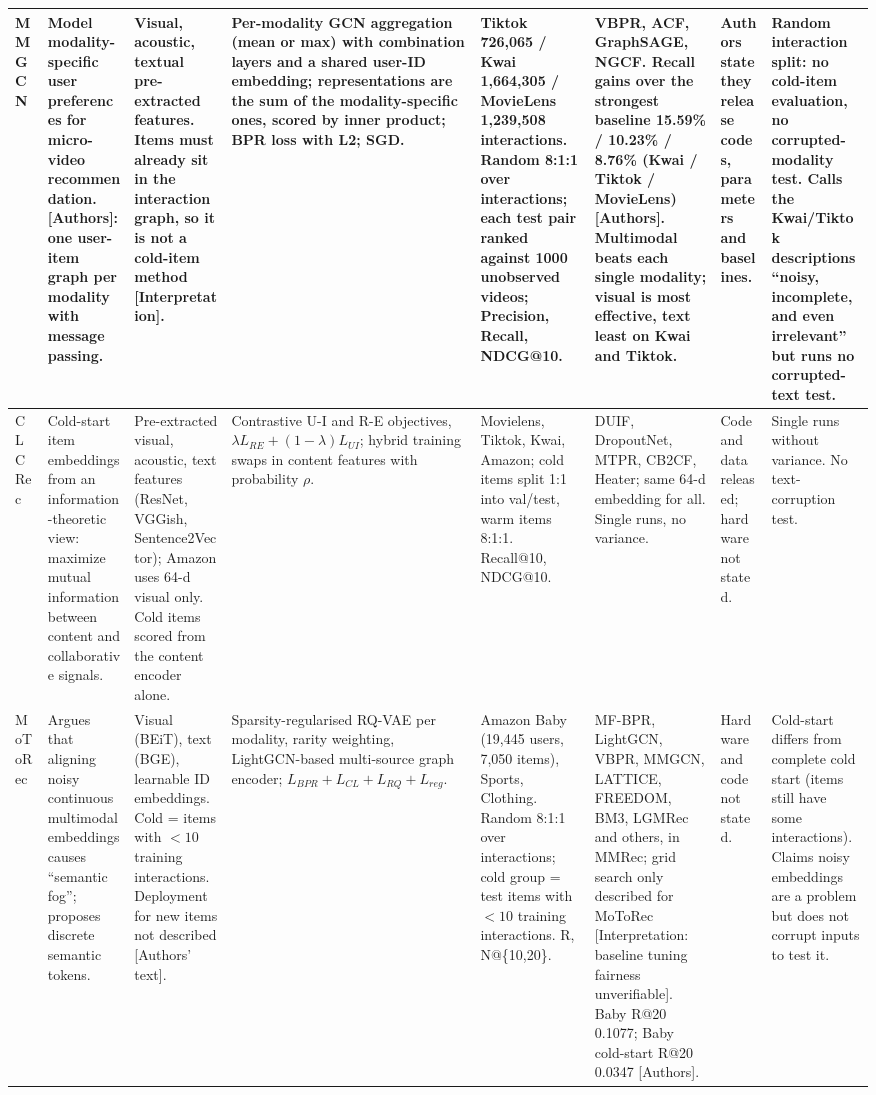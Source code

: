 \documentclass[conference]{IEEEtran}
\begin{document}
\begin{longtable}{@{}p{1.7cm}*{7}{>{\raggedright\arraybackslash}p{2.0cm}}@{}}
MMGCN~\cite{wei2019mmgcn} & Model modality-specific user preferences for micro-video recommendation. [Authors]: one user-item graph per modality with message passing. & Visual, acoustic, textual pre-extracted features. Items must already sit in the interaction graph, so it is not a cold-item method [Interpretation]. & Per-modality GCN aggregation (mean or max) with combination layers and a shared user-ID embedding; representations are the sum of the modality-specific ones, scored by inner product; BPR loss with L2; SGD. & Tiktok 726,065 / Kwai 1,664,305 / MovieLens 1,239,508 interactions. Random 8:1:1 over interactions; each test pair ranked against 1000 unobserved videos; Precision, Recall, NDCG@10. & VBPR, ACF, GraphSAGE, NGCF. Recall gains over the strongest baseline 15.59\% / 10.23\% / 8.76\% (Kwai / Tiktok / MovieLens) [Authors]. Multimodal beats each single modality; visual is most effective, text least on Kwai and Tiktok. & Authors state they release codes, parameters and baselines. & Random interaction split: no cold-item evaluation, no corrupted-modality test. Calls the Kwai/Tiktok descriptions ``noisy, incomplete, and even irrelevant'' but runs no corrupted-text test. \\
\midrule
CLCRec~\cite{wei2021clcrec} & Cold-start item embeddings from an information-theoretic view: maximize mutual information between content and collaborative signals. & Pre-extracted visual, acoustic, text features (ResNet, VGGish, Sentence2Vector); Amazon uses 64-d visual only. Cold items scored from the content encoder alone. & Contrastive U-I and R-E objectives, $\lambda L_{RE} + (1-\lambda) L_{UI}$; hybrid training swaps in content features with probability $\rho$. & Movielens, Tiktok, Kwai, Amazon; cold items split 1:1 into val/test, warm items 8:1:1. Recall@10, NDCG@10. & DUIF, DropoutNet, MTPR, CB2CF, Heater; same 64-d embedding for all. Single runs, no variance. & Code and data released; hardware not stated. & Single runs without variance. No text-corruption test. \\
\midrule
MoToRec~\cite{liu2026motorec} & Argues that aligning noisy continuous multimodal embeddings causes ``semantic fog''; proposes discrete semantic tokens. & Visual (BEiT), text (BGE), learnable ID embeddings. Cold = items with $<10$ training interactions. Deployment for new items not described [Authors' text]. & Sparsity-regularised RQ-VAE per modality, rarity weighting, LightGCN-based multi-source graph encoder; $L_{BPR}+L_{CL}+L_{RQ}+L_{reg}$. & Amazon Baby (19,445 users, 7,050 items), Sports, Clothing. Random 8:1:1 over interactions; cold group = test items with $<10$ training interactions. R, N@\{10,20\}. & MF-BPR, LightGCN, VBPR, MMGCN, LATTICE, FREEDOM, BM3, LGMRec and others, in MMRec; grid search only described for MoToRec [Interpretation: baseline tuning fairness unverifiable]. Baby R@20 0.1077; Baby cold-start R@20 0.0347 [Authors]. & Hardware and code not stated. & Cold-start differs from complete cold start (items still have some interactions). Claims noisy embeddings are a problem but does not corrupt inputs to test it. \\

\end{longtable}
\end{document}
